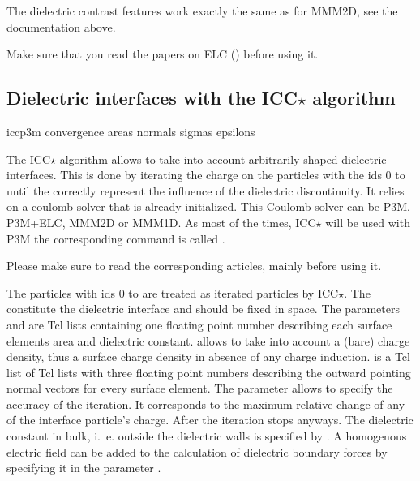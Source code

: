 The dielectric contrast features work exactly the same as for MMM2D,
see the documentation above.

Make sure that you read the papers on ELC (\cite{elc,icelc})
before using it.

\subsection{Dielectric interfaces with the ICC$\star$ algorithm}

\begin{essyntax}
  iccp3m  
  convergence 
  areas 
  normals 
  sigmas 
  epsilons 
  \begin{features}
  \end{features}
\end{essyntax}

The ICC$\star$ algorithm allows to take into account arbitrarily
shaped dielectric interfaces.  This is done by iterating the charge on
the particles with the ids 0 to  until
the correctly represent the influence of the dielectric
discontinuity. It relies on a coulomb solver that is already
initialized. This Coulomb solver can be P3M, P3M+ELC, MMM2D or MMM1D.
As most of the times, ICC$\star$ will be used with P3M the
corresponding command is called .

Please make sure to read the corresponding articles,
mainly\cite{espresso2, tyagi10a, kesselheim11a} before using it.

The particles with ids 0 to  are treated
as iterated particles by ICC$\star$.  The constitute the dielectric
interface and should be fixed in space. The parameters  and
 are Tcl lists containing one floating point number
describing each surface elements area and dielectric
constant.  allows to take into account a (bare) charge
density, thus a surface charge density in absence of any charge
induction.  is a Tcl list of Tcl lists with three
floating point numbers describing the outward pointing normal vectors
for every surface element.  The parameter 
allows to specify the accuracy of the iteration. It corresponds to the
maximum relative change of any of the interface particle's
charge. After  the iteration stops anyways. The
dielectric constant in bulk, i.~e. outside the dielectric walls is
specified by . A homogenous electric field can be added
to the calculation of dielectric boundary forces by specifying it in
the parameter .

